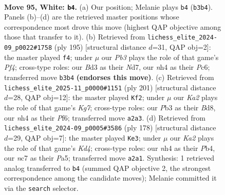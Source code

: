 \documentclass[11pt]{article}
\begin{document}
\clearpage

\begin{figure}[p]\centering
\begin{subfigure}{0.46\textwidth}\centering
\resizebox{\linewidth}{!}{%
\newchessgame
\chessboard[
  setfen={5k2/1Nn5/8/p7/P3P2n/1P1Bp3/K2b3p/8 w - - 0 95},
  showmover=false,
  pgfstyle=straightmove, color=movearrow, markmove={b3-b4}
]}
\caption{}
\end{subfigure}\hfill
\begin{subfigure}{0.46\textwidth}\centering
\resizebox{\linewidth}{!}{%
\newchessgame
\chessboard[
  setfen={8/1p1n4/p1p5/P4p2/3K2kP/1P6/2P5/4B3 b - - 5 98},
  showmover=false,
  pgfstyle=straightmove, color=movearrow, markmove={f5-f4}
]}
\caption{}
\end{subfigure}
\\[4pt]
\begin{subfigure}{0.46\textwidth}\centering
\resizebox{\linewidth}{!}{%
\newchessgame
\chessboard[
  setfen={3b4/8/5p1p/1P3P2/1r2p1P1/R7/2K1B1k1/8 b - - 1 101},
  showmover=false,
  pgfstyle=straightmove, color=movearrow, markmove={g2-f2}
]}
\caption{}
\end{subfigure}\hfill
\begin{subfigure}{0.46\textwidth}\centering
\resizebox{\linewidth}{!}{%
\newchessgame
\chessboard[
  setfen={8/5k2/p3p3/Pb2P1Bp/1P1K3P/8/8/8 w - - 60 90},
  showmover=false,
  pgfstyle=straightmove, color=movearrow, markmove={d4-e3}
]}
\caption{}
\end{subfigure}
\caption{\textbf{Move 95, White: \texttt{b4}.} (a) Our position; Melanie plays \texttt{b4} (\texttt{b3b4}). Panels (b)--(d) are the retrieved master positions whose correspondence most drove this move (highest QAP objective among those that transfer to it). (b) Retrieved from \texttt{lichess\_elite\_2024-09\_p0022\#1758} (ply 195) [structural distance $d$=31, QAP obj=2]: the master played \texttt{f4}; under $\mu$ our \emph{Pb3} plays the role of that game's \emph{Pf4}; cross-type roles: our \emph{B}d3 as their \emph{N}d7, our \emph{n}h4 as their \emph{P}c6; transferred move \texttt{b3b4} \textbf{(endorses this move)}. (c) Retrieved from \texttt{lichess\_elite\_2025-11\_p0000\#1151} (ply 201) [structural distance $d$=28, QAP obj=12]: the master played \texttt{Kf2}; under $\mu$ our \emph{Ka2} plays the role of that game's \emph{Kg7}; cross-type roles: our \emph{P}b3 as their \emph{B}d8, our \emph{n}h4 as their \emph{P}f6; transferred move \texttt{a2a3}. (d) Retrieved from \texttt{lichess\_elite\_2024-09\_p0005\#3586} (ply 178) [structural distance $d$=29, QAP obj=7]: the master played \texttt{Ke3}; under $\mu$ our \emph{Ka2} plays the role of that game's \emph{Kd4}; cross-type roles: our \emph{n}h4 as their \emph{P}b4, our \emph{n}c7 as their \emph{P}a5; transferred move \texttt{a2a1}. Synthesis: 1 retrieved analog transferred to \texttt{b4} (summed QAP objective 2, the strongest correspondence among the candidate moves); Melanie committed it via the \texttt{search} selector.}
\label{fig:thought-m188}
\end{figure}
\end{document}
